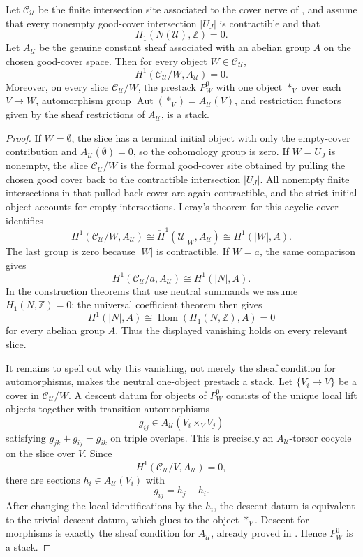 \begin{lemma}\label{lem:formal-site-neutral-stack-h1}
Let \(\mathcal C_{\mathcal U}\) be the finite intersection site associated to the cover nerve of
, and assume that every
nonempty good-cover intersection \(|U_J|\) is contractible and that
\[
H_1(N(\mathcal U),\mathbb Z)=0.
\]
Let
\(A_{\mathcal U}\) be the genuine constant sheaf associated with an abelian
group \(A\) on the chosen good-cover space. Then for every object
\(W\in\mathcal C_{\mathcal U}\),
\[
H^1(\mathcal C_{\mathcal U}/W,A_{\mathcal U})=0.
\]
Moreover, on every slice \(\mathcal C_{\mathcal U}/W\), the prestack
\(P^0_W\) with one object \(*_V\) over each \(V\to W\), automorphism group
\(\operatorname{Aut}(*_V)=A_{\mathcal U}(V)\), and restriction functors
given by the sheaf restrictions of \(A_{\mathcal U}\), is a stack.
\end{lemma}

\begin{proof}
If \(W=\emptyset\), the slice has a terminal initial object with only the
empty-cover contribution and \(A_{\mathcal U}(\emptyset)=0\), so the
cohomology group is zero. If \(W=U_J\) is nonempty, the slice
\(\mathcal C_{\mathcal U}/W\) is the formal good-cover site obtained by
pulling the chosen good cover back to the contractible intersection
\(|U_J|\). All nonempty finite intersections in that pulled-back cover are
again contractible, and the strict initial object accounts for empty
intersections. Leray's theorem for this acyclic cover identifies
\[
H^1(\mathcal C_{\mathcal U}/W,A_{\mathcal U})
\cong
\check H^1(\mathcal U|_W,A_{\mathcal U})
\cong
H^1(|W|,A).
\]
The last group is zero because \(|W|\) is contractible. If \(W=a\), the
same comparison gives
\[
H^1(\mathcal C_{\mathcal U}/a,A_{\mathcal U})
\cong H^1(|N|,A).
\]
In the construction theorems that use neutral summands we assume
\(H_1(N,\mathbb Z)=0\); the universal coefficient theorem then gives
\[
H^1(|N|,A)\cong \operatorname{Hom}(H_1(N,\mathbb Z),A)=0
\]
for every abelian group \(A\). Thus the displayed vanishing holds on every
relevant slice.

It remains to spell out why this vanishing, not merely the sheaf condition
for automorphisms, makes the neutral one-object prestack a stack. Let
\(\{V_i\to V\}\) be a cover in \(\mathcal C_{\mathcal U}/W\). A descent datum
for objects of \(P^0_W\) consists of the unique local lift objects together with
transition automorphisms
\[
g_{ij}\in A_{\mathcal U}(V_i\times_VV_j)
\]
satisfying \(g_{jk}+g_{ij}=g_{ik}\) on triple overlaps. This is precisely an
\(A_{\mathcal U}\)-torsor cocycle on the slice over \(V\). Since
\[
H^1(\mathcal C_{\mathcal U}/V,A_{\mathcal U})=0,
\]
there are sections \(h_i\in A_{\mathcal U}(V_i)\) with
\[
g_{ij}=h_j-h_i.
\]
After changing the local identifications by the \(h_i\), the descent datum
is equivalent to the trivial descent datum, which glues to the object
\(*_V\). Descent for morphisms is exactly the sheaf condition for
\(A_{\mathcal U}\), already proved in
. Hence \(P^0_W\) is a stack.
\end{proof}

